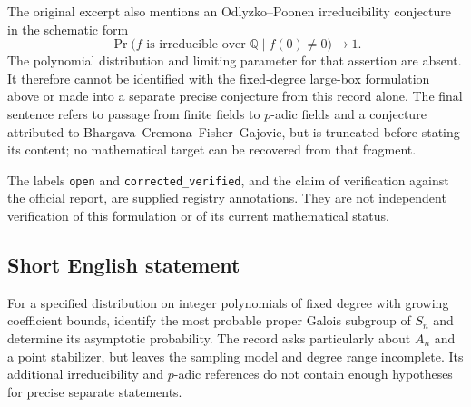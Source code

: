 \documentclass[11pt]{article}
\newcommand{\Q}{\mathbb{Q}}
\begin{document}
The original excerpt also mentions an Odlyzko--Poonen irreducibility conjecture in the schematic form
\[
\Pr\bigl(f\text{ is irreducible over }\Q\mid f(0)\neq0\bigr)\longrightarrow1.
\]
The polynomial distribution and limiting parameter for that assertion are absent. It therefore cannot be identified with the fixed-degree large-box formulation above or made into a separate precise conjecture from this record alone. The final sentence refers to passage from finite fields to \(p\)-adic fields and a conjecture attributed to Bhargava--Cremona--Fisher--Gajovic, but is truncated before stating its content; no mathematical target can be recovered from that fragment.

The labels \texttt{open} and \texttt{corrected\_verified}, and the claim of verification against the official report, are supplied registry annotations. They are not independent verification of this formulation or of its current mathematical status.
\subsection{Short English statement}
For a specified distribution on integer polynomials of fixed degree with growing coefficient bounds, identify the most probable proper Galois subgroup of \(S_n\) and determine its asymptotic probability. The record asks particularly about \(A_n\) and a point stabilizer, but leaves the sampling model and degree range incomplete. Its additional irreducibility and \(p\)-adic references do not contain enough hypotheses for precise separate statements.
\end{document}

